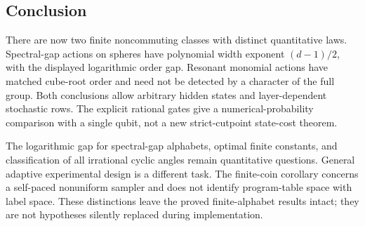 \subsection{Conclusion}
There are now two finite noncommuting classes with distinct quantitative
laws. Spectral-gap actions on spheres have polynomial width exponent
$(d-1)/2$, with the displayed logarithmic order gap. Resonant monomial
actions have matched cube-root order and need not be detected by a
character of the full group. Both conclusions allow arbitrary hidden
states and layer-dependent stochastic rows. The explicit rational gates
give a numerical-probability comparison with a single qubit, not a new
strict-cutpoint state-cost theorem.

The logarithmic gap for spectral-gap alphabets, optimal finite constants,
and classification of all irrational cyclic angles remain quantitative
questions. General adaptive experimental design is a different task.
The finite-coin corollary concerns a self-paced nonuniform sampler and
does not identify program-table space with label space. These distinctions
leave the proved finite-alphabet results intact; they are not hypotheses
silently replaced during implementation.
